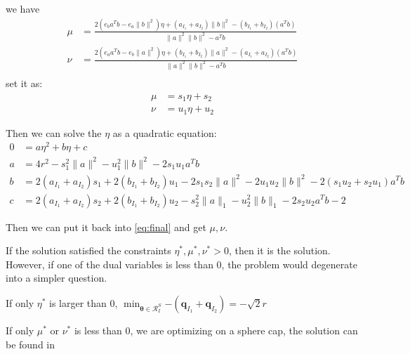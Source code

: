 \documentclass[twoside]{article}
\theoremstyle{plain}
\renewcommand{\vec}[1]{\bm{#1}}
\begin{document}
we have 
\begin{equation}
\begin{split} 
\mu &= \frac{2( e_ba^Tb - e_a\|b\|^2 )\eta + (a_{I_1}+a_{I_2}) \|b\|^2 - (b_{I_1} + b_{I_2}) (a^Tb)}{ \|a\|^2 \|b\|^2 -a^Tb}\\
\nu &=\frac{2( e_aa^Tb - e_b\|a\|^2 )\eta + (b_{I_1}+b_{I_2}) \|a\|^2 - (a_{I_1} + a_{I_2}) (a^Tb)}{ \|a\|^2 \|b\|^2 -a^Tb}\\
 \end{split}
\end{equation}
set it as:
\begin{equation}
\begin{split} 
\mu &= s_1 \eta + s_2\\ 
\nu &= u_1 \eta + u_2
 \end{split}
 \label{eq:final}
\end{equation}

Then we can solve the $\eta$ as a quadratic equation:
\begin{equation}
\begin{split} 
0&=a\eta^2+b\eta+c\\
 a&= 4r^2 - s_1^2\|a\|^2 - u_1^2\|b\|^2 -2s_1 u_1a^Tb\\
b&=2(a_{I_1} + a_{I_2})s_1 +2(b_{I_1} + b_{I_2})u_1 - 2s_1s_2 \|a\|^2 - 2u_1u_2\|b\|^2 - 2(s_1u_2+s_2u_1)a^Tb \\
 c&=2(a_{I_1} + a_{I_2})s_2 +2(b_{I_1} + b_{I_2})u_2 -s_2^2\|a\|_1 -u_2^2\|b\|_1 - 2s_2u_2a^Tb -2
 \end{split}
\end{equation}

Then we can put it back into \ref{eq:final} and get $\mu, \nu$.

If the solution satisfied the constraints $\eta^{*}, \mu^{*}, \nu^{*} > 0$, then it is the solution.
However, if one of the dual variables is less than 0, the problem would degenerate into a simpler question. 

If only $\eta^{*}$ is larger than 0, 
 $\min_{\vec{\theta} \in \mathcal{R}^{S}_{I}}{- ( \vec{q}_{I_1} +\vec{q}_{I_2} )} = -\sqrt{2}r$

If only $\mu^{*}$ or $\nu^{*}$ is less than 0, we are optimizing on a sphere cap, the solution can be found in \cite[supplementary material B]{Yamada_NIPS_2021}
\end{document}
